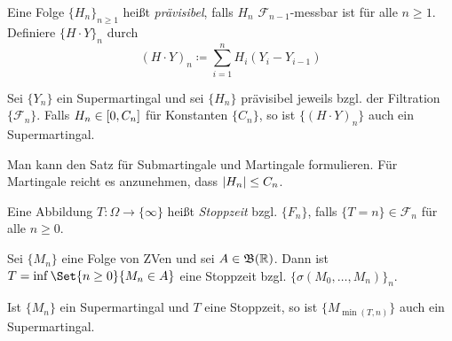 \documentclass{cheat-sheet}
\newcommand{\Bor}{\mathfrak{B}} %
\begin{document}
\begin{defn}
  Eine Folge $\{ H_n \}_{n \geq 1}$ heißt \emph{prävisibel}, falls $H_n$ $\mathcal{F}_{n-1}$-messbar ist für alle $n \geq 1$.
  Definiere $\{ H \cdot Y \}_n$ durch
  \[
    (H \cdot Y)_n \coloneqq \sum_{i=1}^n H_i (Y_i - Y_{i-1})
  \]
\end{defn}

\begin{satz}
  Sei $\{ Y_n \}$ ein Supermartingal und sei $\{ H_n \}$ prävisibel jeweils bzgl. der Filtration $\{ \mathcal{F}_n \}$.
  Falls $H_n \in \left[ 0, C_n \right]$ für Konstanten $\{ C_n \}$, so ist $\{ (H \cdot Y)_n \}$ auch ein Supermartingal.
\end{satz}

\begin{bem}
  Man kann den Satz für Submartingale und Martingale formulieren.
  Für Martingale reicht es anzunehmen, dass $\lvert H_n\rvert \leq C_n$.
\end{bem}

\begin{defn}
  Eine Abbildung $T : \Omega \to \{ \infty \}$ heißt \emph{Stoppzeit} bzgl. $\{ F_n \}$, falls $\{ T=n \} \in \mathcal{F}_n$ für alle $n \geq 0$.
\end{defn}

\begin{bsp}
  Sei $\{ M_n \}$ eine Folge von ZVen und sei $A \in \Bor(\R)$.
  Dann ist $T = \inf \Set{n \geq 0}{M_n \in A}$ eine Stoppzeit bzgl. $\{ \sigma(M_0, \ldots, M_n) \}_n$.
\end{bsp}

\begin{satz}
  Ist $\{ M_n \}$ ein Supermartingal und $T$ eine Stoppzeit, so ist $\{ M_{\min(T, n)} \}$ auch ein Supermartingal.
\end{satz}
\end{document}
